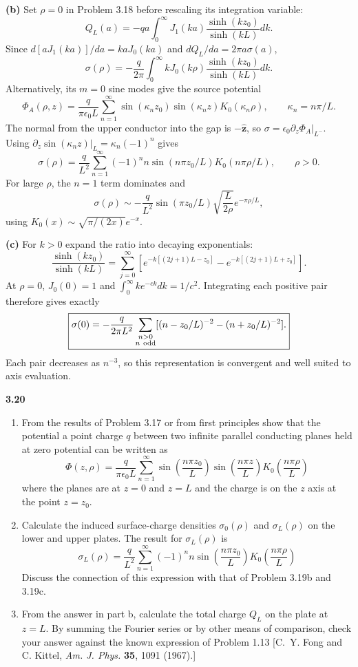 \textbf{(b)} Set $\rho=0$ in Problem 3.18 before rescaling its
integration variable:
\[
Q_L(a)=-qa\int_0^\infty J_1(ka)
\frac{\sinh(kz_0)}{\sinh(kL)}dk.
\]
Since $d[aJ_1(ka)]/da=kaJ_0(ka)$ and
$dQ_L/da=2\pi a\sigma(a)$,
\[
\boxed{\sigma(\rho)=-\frac q{2\pi}\int_0^\infty
kJ_0(k\rho)\frac{\sinh(kz_0)}{\sinh(kL)}dk.}
\]
Alternatively, its $m=0$ sine modes give the source potential
\[
\Phi_A(\rho,z)=\frac{q}{\pi\epsilon_0L}
\sum_{n=1}^\infty\sin(\kappa_nz_0)\sin(\kappa_nz)K_0(\kappa_n\rho),
\qquad \kappa_n=n\pi/L.
\]
The normal from the upper conductor into the gap is $-\hat{\mathbf z}$,
so $\sigma=\epsilon_0\partial_z\Phi_A|_{L^-}$.
Using $\partial_z\sin(\kappa_nz)|_L=\kappa_n(-1)^n$ gives
\[
\sigma(\rho)=\frac q{L^2}\sum_{n=1}^\infty
(-1)^n n\sin(n\pi z_0/L)K_0(n\pi\rho/L),\qquad\rho>0.
\]
For large $\rho$, the $n=1$ term dominates and
\[
\sigma(\rho)\sim-\frac q{L^2}\sin(\pi z_0/L)
\sqrt{\frac{L}{2\rho}}e^{-\pi\rho/L},
\]
using $K_0(x)\sim\sqrt{\pi/(2x)}e^{-x}$.

\textbf{(c)} For $k>0$ expand the ratio into decaying exponentials:
\[
\frac{\sinh(kz_0)}{\sinh(kL)}
=\sum_{j=0}^\infty\left[
 e^{-k[(2j+1)L-z_0]}-e^{-k[(2j+1)L+z_0]}\right].
\]
At $\rho=0$, $J_0(0)=1$ and
$\int_0^\infty ke^{-ck}dk=1/c^2$.  Integrating each positive pair
therefore gives exactly
\[
\boxed{\sigma(0)=-\frac q{2\pi L^2}
\sum_{\substack{n>0\\n\ {\rm odd}}}
[(n-z_0/L)^{-2}-(n+z_0/L)^{-2}].}
\]
Each pair decreases as $n^{-3}$, so this representation is convergent
and well suited to axis evaluation.

\par\bigskip
\noindent\textbf{3.20}\quad\begin{enumerate}
\item[(a)] From the results of Problem 3.17 or from first principles show that the potential  a point charge $q$ between two infinite parallel conducting planes held at zero potential can be written as
\[
\Phi(z,\rho)=\frac{q}{\pi\epsilon_{0}L}\sum_{n=1}^{\infty}\sin\!\left(\frac{n\pi z_{0}}{L}\right)\sin\!\left(\frac{n\pi z}{L}\right)K_{0}\!\left(\frac{n\pi\rho}{L}\right)
\]
where the planes are at $z=0$ and $z=L$ and the charge is on the $z$ axis at the point $z=z_{0}$.
\item[(b)] Calculate the induced surface-charge densities $\sigma_{0}(\rho)$ and $\sigma_{L}(\rho)$ on the lower and upper plates. The result for $\sigma_{L}(\rho)$ is
\[
\sigma_{L}(\rho)=\frac{q}{L^{2}}\sum_{n=1}^{\infty}(-1)^{n}n\sin\!\left(\frac{n\pi z_{0}}{L}\right)K_{0}\!\left(\frac{n\pi\rho}{L}\right)
\]
Discuss the connection of this expression with that of Problem 3.19b and 3.19c.
\item[(c)] From the answer in part b, calculate the total charge $Q_{L}$ on the plate at $z=L$. By summing the Fourier series or by other means of comparison, check your answer against the known expression of Problem 1.13 [C.~Y. Fong and C. Kittel, \emph{Am. J. Phys.} \textbf{35}, 1091 (1967).]
\end{enumerate}
\solution

